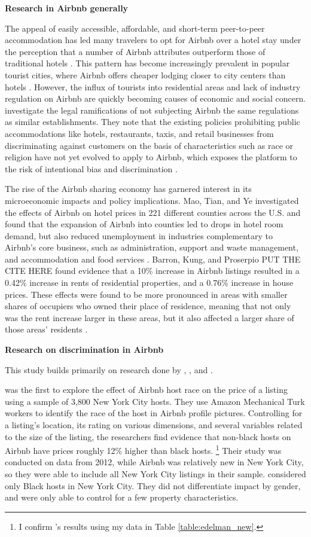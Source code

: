 \textbf{Research in Airbnb generally}

The appeal of easily accessible, affordable, and short-term peer-to-peer accommodation has led many travelers to opt for Airbnb over a hotel stay under the perception that a number of Airbnb attributes outperform those of traditional hotels \citep{guttentag}. This pattern has become increasingly prevalent in popular tourist cities, where Airbnb offers cheaper lodging closer to city centers than hotels \citep{gutierrez}. However, the influx of tourists into residential areas and lack of industry regulation on Airbnb are quickly becoming causes of economic and social concern. \cite{leong} investigate the legal ramifications of not subjecting Airbnb the same regulations as similar establishments. They note that the existing policies prohibiting public accommodations like hotels, restaurants, taxis, and retail businesses from discriminating against customers on the basis of characteristics such as race or religion have not yet evolved to apply to Airbnb, which exposes the platform to the risk of intentional bias and discrimination \citep{leong}. 

The rise of the Airbnb sharing economy has garnered interest in its microeconomic impacts and policy implications. Mao, Tian, and Ye investigated the effects of Airbnb on hotel prices in 221 different counties across the U.S. and found that the expansion of Airbnb into counties led to drops in hotel room demand, but also reduced unemployment in industries complementary to Airbnb’s core business, such as administration, support and waste management, and accommodation and food services \citep{mao}. Barron, Kung, and Proserpio \cite{}PUT THE CITE HERE found evidence that a 10\% increase in Airbnb listings resulted in a 0.42\% increase in rents of residential properties, and a 0.76\% increase in house prices. These effects were found to be more pronounced in areas with smaller shares of occupiers who owned their place of residence, meaning that not only was the rent increase larger in these areas, but it also affected a larger share of those areas’ residents \citep{barron}.


\textbf{Research on discrimination in Airbnb}

This study builds primarily on research done by \cite{edelman}, \cite{wang}, and \cite{kakar}. 

\cite{edelman} was the first to explore the effect of Airbnb host race on the price of a listing using a sample of 3,800 New York City hosts. They use Amazon Mechanical Turk workers to identify the race of the host in Airbnb profile pictures. Controlling for a listing's location, its rating on various dimensions, and several variables related to the size of the listing, the researchers find evidence that non-black hosts on Airbnb have prices roughly 12\% higher than black hosts.%
	\footnote{I confirm \cite{edelman}’s results using my data in Table \ref{table:edelman_new}.} 
Their study was conducted on data from 2012, while Airbnb was relatively new in New York City, so they were able to include all New York City listings in their sample. \cite{edelman} considered only Black hosts in New York City. They did not differentiate impact by gender, and were only able to control for a few property characteristics. 

